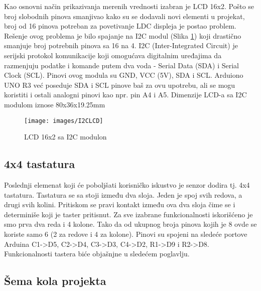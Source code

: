 \documentclass[a4paper, 12pt]{article}
\begin{document}
	Kao osnovni način prikazivanja merenih vrednosti izabran je LCD 16x2. Pošto se broj slobodnih pinova smanjivao kako su se dodavali novi elementi u projekat, broj od 16 pinova potreban za povetivanje LDC displeja je postao problem. Rešenje ovog problema je bilo spajanje na I2C modul (Slika \ref{fig:I2CLCD}) koji drastično smanjuje broj potrebnih pinova sa 16 na 4. I2C (Inter-Integrated Circuit) je serijski protokol komunikacije koji omogućava digitalnim uređajima da razmenjuju podatke i komande putem dva voda - Serial Data (SDA) i Serial Clock (SCL). Pinovi ovog modula su GND, VCC (5V), SDA i SCL. Arduiono UNO R3 već poseduje SDA i SCL pinove baš za ovu upotrebu, ali se mogu koristiti i ostali analogni pinovi kao npr. pin A4 i A5. Dimenzije LCD-a sa I2C modulom iznose 80x36x19.25mm
	
	\begin{figure}[H]
\centering
\texttt{[image: images/I2CLCD]}
\caption{LCD 16x2 sa I2C modulon} \label{fig:I2CLCD}
\end{figure}
	


	\subsection{4x4 tastatura}
	
	Poslednji elemenat koji će poboljšati korisničko iskustvo je senzor dodira tj. 4x4 tastatura. Tastatura se sa stoji između dva sloja. Jeden je spoj svih redova, a drugi svih kolini. Pritiskom se pravi kontakt između ova dva sloja čime se i determiniše koji je taster pritisnut. Za sve izabrane funkcionalnosti iskorišćeno je smo prva dva reda i 4 kolone. Tako da od ukupnog broja pinova kojih je 8 ovde se koriste samo 6 (2 za redove i 4 za kolone). Pinovi su spojeni na sledeće portove Arduina C1->D5, C2->D4, C3->D3, C4->D2, R1->D9 i R2->D8. Funkcionalnosti tastera biće objašnjne u sledećem poglavlju.
	
\pagebreak

	\subsection*{Šema kola projekta}
	
\begin{figure}[H]
\centering
{} 
\label{fig:circuit_diagram}
\end{figure}

\vspace{10pt}
\end{document}
